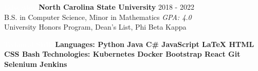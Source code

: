 \documentclass{resume}
\begin{document}
\setlength\fboxsep{0.33em}

\begin{rSection}{\colorbox{NCSURED}{\textcolor{WHITE}{Education}}}
{\bf North Carolina State University} \hfill {2018 - 2022} \\ 
B.S. in Computer Science, Minor in Mathematics \hfill {\em GPA: 4.0}\\
University Honors Program, Dean's List, Phi Beta Kappa

\end{rSection}

\begin{rSection}{\colorbox{NCSURED}{\textcolor{WHITE}{Technical Skills}}}
	\textbf{Languages:
		\hspace*{0.275cm}
		{Python} \textbar
		{ Java} \textbar
		{ C\#} \textbar
		{ JavaScript} \textbar
		{ \LaTeX} \textbar
		{ HTML} \textbar
		{ CSS} \textbar
		{ Bash}
	} \newline
	\textbf{Technologies:
		{Kubernetes} \textbar
		{ Docker} \textbar
		{ Bootstrap} \textbar
		{ React} \textbar
		{ Git} \textbar
		{ Selenium} \textbar
		{ Jenkins}
	}	
\end{rSection}
\end{document}
